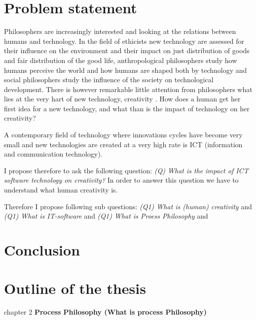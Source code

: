 \section{Problem statement}

Philosophers are increasingly interested and looking at the relations between humans and technology. 
In the field of ethicists new technology are assessed for their influence on the environment and their impact on just distribution of goods and fair distribution of the good life,  anthropological philosophers study how humans perceive the world and how humans are shaped both by technology and social philosophers study the influence of the society on technological development.
There is however remarkable little attention from philosophers what lies at the very hart of new technology, creativity \cite{gaut2010philosophy}. How does a human get her first idea for a new technology, and what than is the impact of technology on her creativity?

A contemporary field of technology where innovations cycles have become very small and new technologies are created at a very high rate is ICT (information and communication technology).

I propose therefore to ask the following question:
\textit{(Q) What is the impact of ICT software technology on creativity?}
In order to answer this question we have to understand what human creativity is. 

Therefore I propose following sub questions:
\textit{(Q1) What is (human) creativity} and  
\textit{(Q1) What is IT-software} and  
\textit{(Q1) What is Proess Philosophy} and  

\section{Conclusion}

\section{Outline of the thesis}
chapter 2
\textbf{Process Philosophy (What is process Philosophy)}

